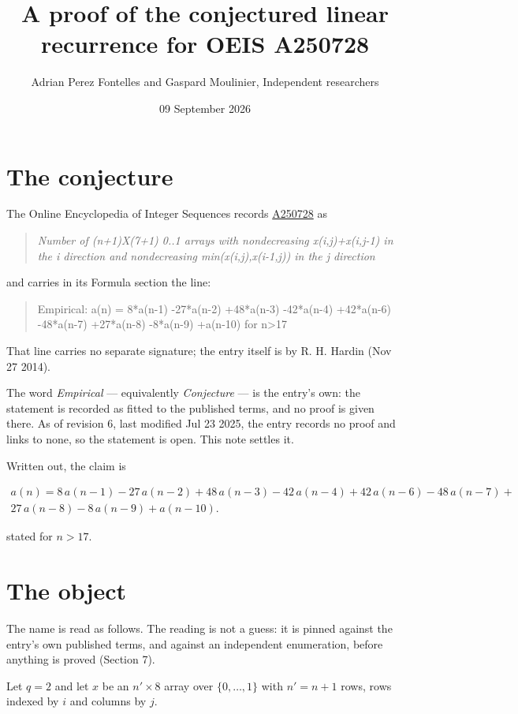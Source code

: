 \documentclass[11pt]{article}
\title{A proof of the conjectured linear recurrence for OEIS A250728}
\author{Adrian Perez Fontelles and Gaspard Moulinier, Independent researchers}
\date{09 September 2026}
\theoremstyle{definition}
\begin{document}
\maketitle
\section{The conjecture}

The Online Encyclopedia of Integer Sequences records \href{https://oeis.org/A250728}{A250728} as

\begin{quote}\itshape Number of (n+1)X(7+1) 0..1 arrays with nondecreasing x(i,j)+x(i,j-1) in the i direction and nondecreasing min(x(i,j),x(i-1,j)) in the j direction\end{quote}

and carries in its Formula section the line:

\begin{quote}\ttfamily Empirical: a(n) = 8*a(n-1) -27*a(n-2) +48*a(n-3) -42*a(n-4) +42*a(n-6) -48*a(n-7) +27*a(n-8) -8*a(n-9) +a(n-10) for n>17\end{quote}

That line carries no separate signature; the entry itself is by R. H. Hardin (Nov 27 2014).

The word {\itshape Empirical} --- equivalently {\itshape Conjecture} --- is the entry's own: the statement is recorded as fitted to the published terms, and no proof is given there. As of revision 6, last modified Jul 23 2025, the entry records no proof and links to none, so the statement is open. This note settles it.

Written out, the claim is

\begin{multline*} a(n) = 8\,a(n-1) - 27\,a(n-2) + 48\,a(n-3) - 42\,a(n-4) + 42\,a(n-6) - 48\,a(n-7) + \\ 27\,a(n-8) - 8\,a(n-9) + a(n-10). \end{multline*}

stated for $n > 17$.

\section{The object}

The name is read as follows. The reading is not a guess: it is pinned against the entry's own published terms, and against an independent enumeration, before anything is proved (Section 7).

Let $q = 2$ and let $x$ be an $n' \times 8$ array over $\{0,\dots,1\}$ with $n' = n + 1$ rows, rows indexed by $i$ and columns by $j$.
\end{document}
